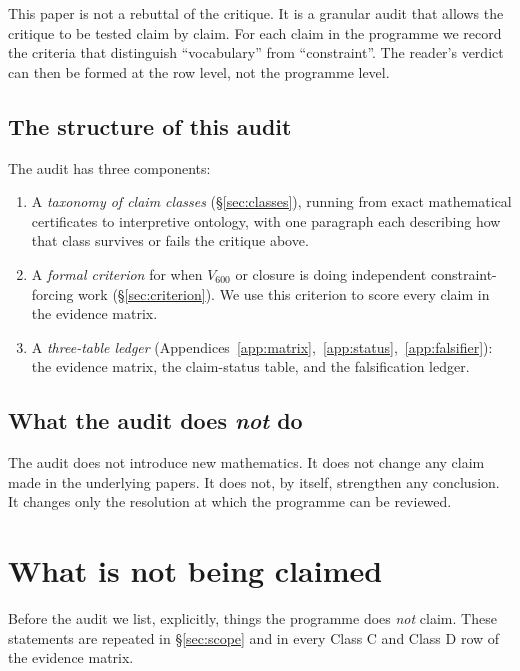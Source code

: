 \documentclass[11pt,a4paper]{article}
\newcommand{\Vsix}{V_{600}}
\begin{document}
This paper is not a rebuttal of the critique. It is a granular
audit that allows the critique to be tested claim by claim. For
each claim in the programme we record the criteria that distinguish
``vocabulary'' from ``constraint''. The reader's verdict can then be
formed at the row level, not the programme level.

\subsection{The structure of this audit}

The audit has three components:

\begin{enumerate}[leftmargin=*]
  \item A \emph{taxonomy of claim classes} (\S\ref{sec:classes}),
        running from exact mathematical certificates to interpretive
        ontology, with one paragraph each describing how that class
        survives or fails the critique above.
  \item A \emph{formal criterion} for when $\Vsix$ or closure is
        doing independent constraint-forcing work
        (\S\ref{sec:criterion}). We use this criterion to score
        every claim in the evidence matrix.
  \item A \emph{three-table ledger}
        (Appendices~\ref{app:matrix},~\ref{app:status},~\ref{app:falsifier}):
        the evidence matrix, the claim-status table, and the
        falsification ledger.
\end{enumerate}

\subsection{What the audit does \emph{not} do}

The audit does not introduce new mathematics. It does not change
any claim made in the underlying papers. It does not, by itself,
strengthen any conclusion. It changes only the resolution at which
the programme can be reviewed.

\section{What is not being claimed}
\label{sec:notclaimed}

Before the audit we list, explicitly, things the programme does
\emph{not} claim. These statements are repeated in
\S\ref{sec:scope} and in every Class C and Class D row of the
evidence matrix.
\end{document}
